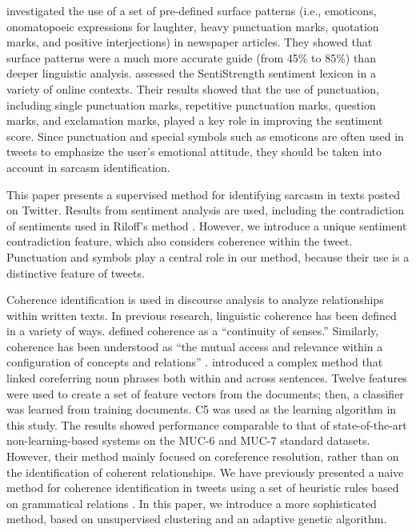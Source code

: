 \documentclass[english]{jnlp_1.4}
\begin{document}
 investigated the use of a set of pre-defined surface patterns (i.e., emoticons, onomatopoeic expressions for laughter, heavy punctuation marks, quotation marks, and positive interjections) in newspaper articles.
They showed that surface patterns were a much more accurate guide (from 45\% to 85\%) than deeper linguistic analysis.
 assessed the SentiStrength sentiment lexicon in a variety of online contexts.
Their results showed that the use of punctuation, including single punctuation marks, repetitive punctuation marks, question marks, and exclamation marks, played a key role in improving the sentiment score.
Since punctuation and special symbols such as emoticons are often used in tweets to emphasize the user's emotional attitude, they should be taken into account in sarcasm identification.

This paper presents a supervised method for identifying sarcasm in texts posted on Twitter.
Results from sentiment analysis are used, including the contradiction of sentiments used in Riloff's method \cite{Ellen_2013}.
However, we introduce a unique sentiment contradiction feature, which also considers coherence within the tweet.
Punctuation and symbols play a central role in our method, because their use is a distinctive feature of tweets.

Coherence identification is used in discourse analysis to analyze relationships within written texts.
In previous research, linguistic coherence has been defined in a variety of ways.
 defined coherence as a ``continuity of senses.''
Similarly, coherence has been understood as ``the mutual access and relevance within a configuration of concepts and relations'' \cite{Beaugrande_1996}.
 introduced a complex method that linked coreferring noun phrases both within and across sentences.
Twelve features were used to create a set of feature vectors from the documents; then, a classifier was learned from training documents.
C5 \cite{Rutvija_2015} was used as the learning algorithm in this study.
The results showed performance comparable to that of state-of-the-art non-learning-based systems on the MUC-6 and MUC-7 standard datasets.
However, their method mainly focused on coreference resolution, rather than on the identification of coherent relationships.
We have previously presented a naive method for coherence identification in tweets using a set of heuristic rules based on grammatical relations \cite{Tungthamthiti_2014}.
In this paper, we introduce a more sophisticated method, based on unsupervised clustering and an adaptive genetic algorithm.
\end{document}
